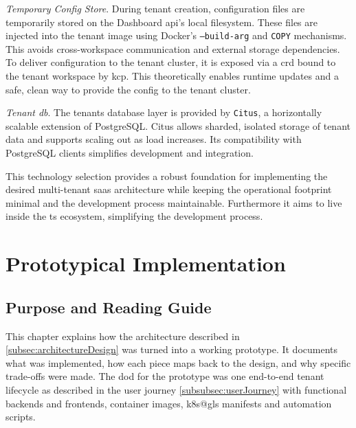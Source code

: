 \documentclass[11pt, a4paper, oneside, listof=totoc]{scrartcl}
\begin{document}
\begin{enumerate}[label={[\arabic*]:},
                ref=Challenge~\arabic*,
                leftmargin=*,
                itemsep=0.6\baselineskip]
                \item\label{chal:tempConfigStore}
                    \textit{Temporary Config Store}.
                    During tenant creation, configuration files are temporarily stored on the
                    Dashboard \gls{api}'s local filesystem.
                    These files are injected into the tenant image using Docker's
                    \texttt{--build-arg} and \texttt{COPY} mechanisms.
                    This avoids cross-workspace communication and external storage dependencies.
                    To deliver configuration to the tenant cluster, it is exposed via a \gls{crd}
                    bound to the tenant workspace by \gls{kcp}.
                    This theoretically enables runtime updates and a safe, clean way to provide
                    the config to the tenant cluster.

                \item\label{chal:tenantDB2}
                    \textit{Tenant \gls{db}}.
                    The tenants database layer is provided by \texttt{Citus}, a horizontally
                    scalable extension of PostgreSQL.\@
                    Citus allows sharded, isolated storage of tenant data and supports scaling out
                    as load increases.
                    Its compatibility with PostgreSQL clients simplifies development and
                    integration.

            \end{enumerate}

            This technology selection provides a robust foundation for implementing the desired
            multi-tenant \gls{saas} architecture while keeping the operational footprint minimal and
            the development process maintainable.
            Furthermore it aims to live inside the \gls{ts} ecosystem, simplifying the development
            process.

    \clearpage

    \section{Prototypical Implementation}\label{sec:prototype}

        \subsection{Purpose and Reading Guide}\label{subsec:purposeAndReadingGuide}
            This chapter explains how the architecture described in
            \autoref{subsec:architectureDesign} was turned into a working prototype.
            It documents what was implemented, how each piece maps back to the design, and why
            specific trade-offs were made.
            The \gls{dod} for the prototype was one end-to-end tenant lifecycle as described in
            the user journey \autoref{subsubsec:userJourney} with functional backends and frontends,
            container images, \gls{k8s@gls} manifests and automation scripts.
\end{document}
